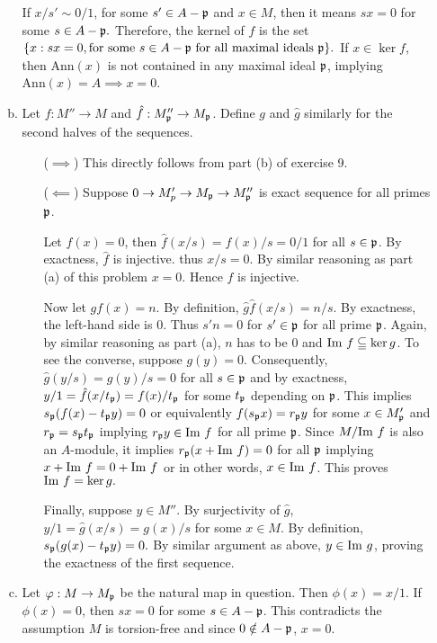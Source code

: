 \documentclass{article}
\theoremstyle{definition}
\theoremstyle{remark}
\begin{document}
\begin{enumerate}[(1)]
\begin{enumerate}[(a)]
                \newcommand{\Ann}{\mathrm{Ann}}
                If $x/s' \sim 0/1$, for some $s' \in A -\mathfrak{p}$ and $x \in M$,  then it means $sx = 0$ for some $s \in A - \mathfrak{p}.$ Therefore, the kernel of $f$ is the set $\{x : sx = 0, \text{for some }s \in A - \mathfrak{p} \text{ for all maximal ideals } \mathfrak{p}\}.$ If $x \in \ker f$, then $\Ann(x)$ is not contained in any maximal ideal $\mathfrak{p}$, implying $\Ann(x) = A \implies x = 0$.



                \newcommand{\p}{\I p}
                \newcommand{\h}[1]{\hat{#1}}
          \item Let $f: M'' \to M$ and $\h f: M''_\p \to M_\p$. Define $g$ and $\h g$ similarly for the second halves of the sequences.

                \begin{itemize}
                  \item[($\implies$)] This directly follows from part (b) of exercise 9.
                  \item[($\impliedby$)] Suppose $0 \to M'_p \to M_\p \to M''_\p$ is exact sequence for all primes $\p$.

                        Let $f(x) = 0$, then  $\h f(x/s) = f(x)/s = 0/1$ for all $s \in \p$. By exactness, $\h f$ is injective. thus $x/s = 0$. By similar reasoning as part (a) of this problem $x = 0$. Hence $f$ is injective.

                        Now let $gf(x) = n$. By definition, $\h g \h f(x/s) = n/s$. By exactness, the left-hand side is $0$. Thus $s'n = 0$ for $s' \in \p$ for all prime $\p$. Again, by similar reasoning as part (a), $n$ has to be $0$ and $\mathrm{Im}\  f \subseteqq \ker g$. To see the converse, suppose $g(y) = 0$. Consequently, $\h g(y/s) =  g(y)/s = 0$ for all $s \in \p$ and  by exactness,  $y/1 = \h f(x/t_\p) = f(x)/t_\p$ for some $t_\p$ depending on $\p$. This implies $s_\p(f(x) - t_\p y) = 0$ or equivalently $f(s_\p x) = r_\p y$ for some $x \in M'_\p$ and $r_\p = s_\p t_\p$ implying $r_\p y \in \Img f$ for all prime $\p$. Since $M/\mathrm{Im}\  f$ is also an $A$-module, it implies $r_\p(x + \Img f) = 0$ for all $\p$ implying $x + \mathrm{Im}\  f = 0 + \mathrm{Im}\  f$ or in other words, $x \in \mathrm{Im}\  f$. This proves $\mathrm{Im}\  f  = \ker g.$

                        Finally, suppose $y \in M''$. By surjectivity of $\h g$, $y/1 = \h g(x/s) = g(x)/s$ for some $x \in M$. By definition, $s_\p(g(x) - t_\p y) = 0.$ By similar argument as above, $y \in \mathrm{Im}\  g$, proving the exactness of the first sequence.

                \end{itemize}
                \item Let $\phi: M \to M_\p$ be the natural map in question. Then $\phi(x) = x/1$. If $\phi(x) = 0$, then $sx = 0$ for some $s \in A - \p$. This contradicts the assumption $M$ is torsion-free and since $0 \notin A - \p$, $x = 0$.
        \end{enumerate}
\end{enumerate}
\end{document}

